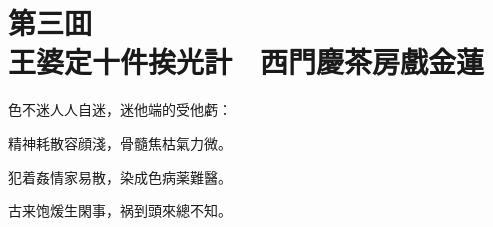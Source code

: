 
\chapter*{第三囬　\\王婆定十件挨光計　西門慶茶房戲金蓮}


\begin{myquote}
色不迷人人自迷，迷他端的受他虧：

精神耗散容顔淺，骨髓焦枯氣力微。

犯着姦情家易散，染成色病薬難醫。

古来饱煖生閑事，祸到頭來總不知。
\end{myquote}

